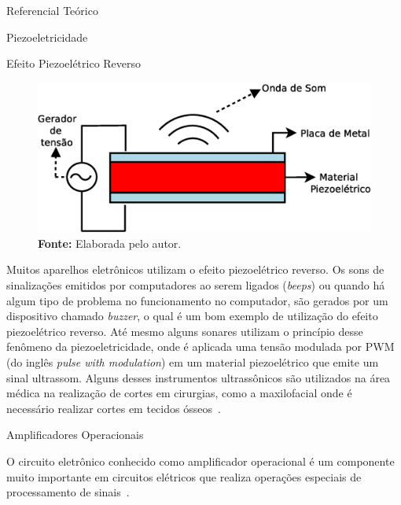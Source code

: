 \begin{chapter}{Referencial Teórico}
\begin{section}{Piezoeletricidade}
\begin{subsection}{Efeito Piezoelétrico Reverso}
\begin{figure}[!h]
	\centering
	\begin{minipage}[c]{\textwidth}
	\centering
	\includegraphics[width=0.8\linewidth]{fig/EfeitoPiezoEletricoReverso}
	\caption{Efeito piezoelétrico reverso.}
	\vspace{-1cm}
	\caption*{\textbf{Fonte: }Elaborada pelo autor.}
	\label{fig:reverso}
	\end{minipage}
\end{figure}

\vspace{-1cm}
Muitos aparelhos eletrônicos utilizam o efeito piezoelétrico reverso. Os sons de
sinalizações emitidos por computadores ao serem ligados (\textit{beeps}) ou
quando há algum tipo de problema no funcionamento no computador, são gerados por
um dispositivo chamado \textit{buzzer}, o qual é um bom exemplo de utilização do
efeito piezoelétrico reverso.  Até mesmo alguns sonares utilizam o princípio
desse fenômeno da piezoeletricidade, onde é aplicada uma tensão modulada por PWM
(do inglês \textit{pulse with modulation}) em um material piezoelétrico que
emite um sinal ultrassom. Alguns desses instrumentos ultrassônicos são
utilizados na área médica na realização de cortes em cirurgias, como a
maxilofacial onde é necessário realizar cortes em tecidos
ósseos~\cite{Carvalho17}. 
 
\end{subsection}

\end{section}

\begin{section}{Amplificadores Operacionais} 

O circuito eletrônico conhecido como amplificador operacional é um componente
muito importante em circuitos elétricos que realiza operações especiais de
processamento de sinais~\cite{Richard2000}. 


\end{section}
\end{chapter}
